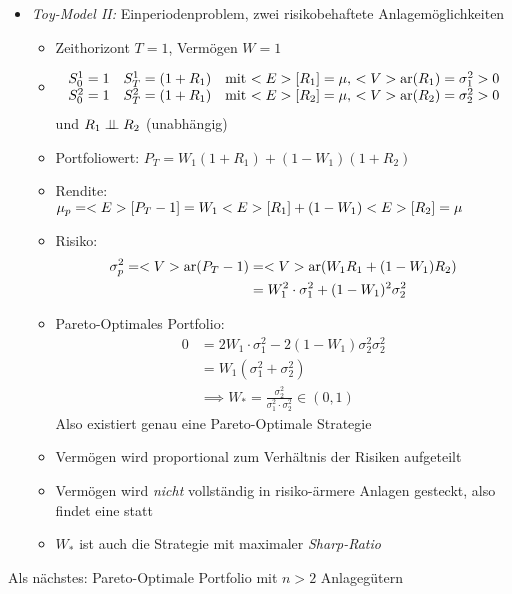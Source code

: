 \begin{itemize}
	\item \emph{Toy-Model II:} Einperiodenproblem, zwei risikobehaftete Anlagemöglichkeiten
	\begin{itemize}
		\item Zeithorizont $T=1$, Vermögen $W=1$
		\item 
		\begin{align*}
			\begin{matrix}
				S_0^1 = 1 & S_T^1 = (1+R_1) & \text{mit $<E>[R_1] = \mu$, $<V>\text{ar}(R_1) = \sigma_1^2 > 0$}\\
				S_0^2 = 1 & S_T^2 = (1+R_1) & \text{mit $<E>[R_2] = \mu$, $<V>\text{ar}(R_2) = \sigma_2^2 > 0$}
			\end{matrix}
		\end{align*}
		und $R_1 \perp\!\!\!\perp R_2$ (unabhängig)
		\item Portfoliowert: $P_T = W_1(1+R_1) + (1-W_1)(1+R_2)$
		\item Rendite: $\mu_p = <E>[P_T -1] = W_1<E>[R_1] + (1-W_1)<E>[R_2] = \mu$
		\item Risiko:
		\begin{align*}
			\sigma_p^2 = <V>\text{ar}(P_T -1) &= <V>\text{ar}(W_1 R_1 + (1-W_1)R_2)\\
			&= W^2_1\cdot \sigma_1^2 + (1-W_1)^2\sigma_2^2
		\end{align*}
		\item Pareto-Optimales Portfolio: 
		\begin{align*}
			0 &= 2W_1\cdot \sigma_1^2 - 2(1-W_1)\sigma_2^2
			\sigma_2^2\\
			&= W_1(\sigma_1^2 + \sigma_2^2)\\
			&\implies W_{\ast} = \frac{\sigma_2^2}{\sigma_1^2\cdot \sigma_2^2} \in (0,1)
		\end{align*}
		Also existiert genau eine Pareto-Optimale Strategie
		\item Vermögen wird proportional zum Verhältnis der Risiken aufgeteilt
		\item Vermögen wird \emph{nicht} vollständig in risiko-ärmere Anlagen gesteckt, also findet eine  statt
		\item $W_{\ast}$ ist auch die Strategie mit maximaler \emph{Sharp-Ratio}
	\end{itemize}
\end{itemize}
Als nächstes: Pareto-Optimale Portfolio mit $n>2$ Anlagegütern
